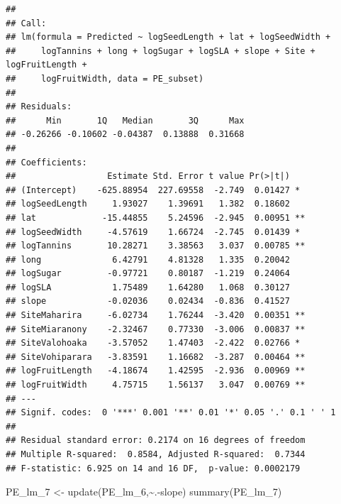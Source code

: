 \documentclass[
  12pt,
]{article}
\newenvironment{Shaded}{\begin{snugshade}}{\end{snugshade}}
\newcommand{\FunctionTok}[1]{\textcolor[rgb]{0.00,0.00,0.00}{#1}}
\newcommand{\NormalTok}[1]{#1}
\newcommand{\OtherTok}[1]{\textcolor[rgb]{0.56,0.35,0.01}{#1}}
\newcommand{\SpecialCharTok}[1]{\textcolor[rgb]{0.00,0.00,0.00}{#1}}
\begin{document}
\begin{verbatim}
## 
## Call:
## lm(formula = Predicted ~ logSeedLength + lat + logSeedWidth + 
##     logTannins + long + logSugar + logSLA + slope + Site + logFruitLength + 
##     logFruitWidth, data = PE_subset)
## 
## Residuals:
##      Min       1Q   Median       3Q      Max 
## -0.26266 -0.10602 -0.04387  0.13888  0.31668 
## 
## Coefficients:
##                  Estimate Std. Error t value Pr(>|t|)   
## (Intercept)    -625.88954  227.69558  -2.749  0.01427 * 
## logSeedLength     1.93027    1.39691   1.382  0.18602   
## lat             -15.44855    5.24596  -2.945  0.00951 **
## logSeedWidth     -4.57619    1.66724  -2.745  0.01439 * 
## logTannins       10.28271    3.38563   3.037  0.00785 **
## long              6.42791    4.81328   1.335  0.20042   
## logSugar         -0.97721    0.80187  -1.219  0.24064   
## logSLA            1.75489    1.64280   1.068  0.30127   
## slope            -0.02036    0.02434  -0.836  0.41527   
## SiteMaharira     -6.02734    1.76244  -3.420  0.00351 **
## SiteMiaranony    -2.32467    0.77330  -3.006  0.00837 **
## SiteValohoaka    -3.57052    1.47403  -2.422  0.02766 * 
## SiteVohiparara   -3.83591    1.16682  -3.287  0.00464 **
## logFruitLength   -4.18674    1.42595  -2.936  0.00969 **
## logFruitWidth     4.75715    1.56137   3.047  0.00769 **
## ---
## Signif. codes:  0 '***' 0.001 '**' 0.01 '*' 0.05 '.' 0.1 ' ' 1
## 
## Residual standard error: 0.2174 on 16 degrees of freedom
## Multiple R-squared:  0.8584, Adjusted R-squared:  0.7344 
## F-statistic: 6.925 on 14 and 16 DF,  p-value: 0.0002179
\end{verbatim}

\begin{Shaded}
\begin{Highlighting}[]
\NormalTok{PE\_lm\_7 }\OtherTok{\textless{}{-}} \FunctionTok{update}\NormalTok{(PE\_lm\_6,}\SpecialCharTok{\textasciitilde{}}\NormalTok{.}\SpecialCharTok{{-}}\NormalTok{slope)}
\FunctionTok{summary}\NormalTok{(PE\_lm\_7)}
\end{Highlighting}
\end{Shaded}
\end{document}
